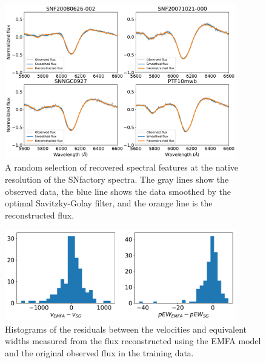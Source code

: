 \begin{figure}[!htb]
    \centering
    \includegraphics[width=0.9\textwidth]{figures/si_feat_pca/example_reconstruction.pdf}
    \caption{A random selection of recovered spectral features at the native resolution of the SNfactory spectra. The gray lines show the observed data, the blue line shows the data smoothed by the optimal Savitzky-Golay filter, and the orange line is the reconstructed flux.}
    \label{feature_recovery}
\end{figure}

\begin{figure}[!htb]
    \centering
    \includegraphics[width=0.9\textwidth]{figures/si_feat_pca/snf_recovery_resids.pdf}
    \caption{Histograms of the residuals between the velocities and equivalent widths measured from the flux reconstructed using the EMFA model and the original observed flux in the training data.}
    \label{snf_hist_resids_native_resolution}
\end{figure}

